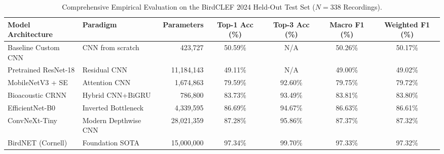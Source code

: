 \begin{table}[t]
\centering
\caption{Comprehensive Empirical Evaluation on the BirdCLEF 2024 Held-Out Test Set ($N=338$ Recordings).}
\label{tab:bioacoustic_benchmark}
\small
\begin{tabular}{llrcccc}
\toprule
\textbf{Model Architecture} & \textbf{Paradigm} & \textbf{Parameters} & \textbf{Top-1 Acc (\%)} & \textbf{Top-3 Acc (\%)} & \textbf{Macro F1 (\%)} & \textbf{Weighted F1 (\%)} \\
\midrule
Baseline Custom CNN & CNN from scratch & 423,727 & 50.59\% & N/A & 50.26\% & 50.17\% \\
Pretrained ResNet-18 & Residual CNN & 11,184,143 & 49.11\% & N/A & 49.00\% & 49.02\% \\
MobileNetV3 + SE & Attention CNN & 1,674,863 & 79.59\% & 92.60\% & 79.75\% & 79.72\% \\
Bioacoustic CRNN & Hybrid CNN+BiGRU & 786,800 & 83.73\% & 93.49\% & 83.81\% & 83.80\% \\
EfficientNet-B0 & Inverted Bottleneck & 4,339,595 & 86.69\% & 94.67\% & 86.63\% & 86.61\% \\
ConvNeXt-Tiny & Modern Depthwise CNN & 28,021,359 & 87.28\% & 95.86\% & 87.37\% & 87.32\% \\
BirdNET (Cornell) & Foundation SOTA & 15,000,000 & 97.34\% & 99.70\% & 97.33\% & 97.32\% \\
\bottomrule
\end{tabular}
\end{table}

